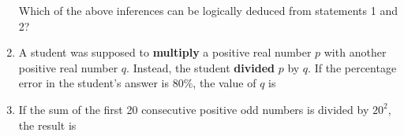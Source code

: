 \documentclass[journal]{IEEEtran}
\numberwithin{equation}{enumi}
\numberwithin{figure}{enumi}
\begin{document}
\begin{enumerate}
Which of the above inferences can be logically deduced from statements 1 and 2?



\begin{enumerate}
\end{enumerate}
\bigskip

\item A student was supposed to \textbf{multiply} a positive real number $ p $ with another positive real number $ q $. Instead, the student \textbf{divided} $ p $ by $ q $. If the percentage error in the student's answer is 80\%, the value of $ q $ is 



\begin{enumerate}
\end{enumerate}
\bigskip

\item If the sum of the first 20 consecutive positive odd numbers is divided by $ 20^2 $, the result is 



\begin{enumerate}
\end{enumerate}
\bigskip


\end{enumerate}
\end{document}
